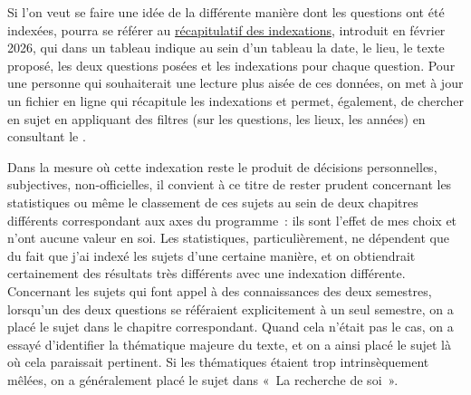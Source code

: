 Si l'on veut se faire une idée de la différente manière dont les questions ont été indexées, pourra se référer au \hyperlink{synthesesujets}{récapitulatif des indexations}, introduit en février 2026, qui dans un tableau indique au sein d'un tableau la date, le lieu, le texte proposé, les deux questions posées et les indexations pour chaque question. Pour une personne qui souhaiterait une lecture plus aisée de ces données, on met à jour un fichier en ligne qui récapitule les indexations et permet, également, de chercher en sujet en appliquant des filtres (sur les questions, les lieux, les années) en consultant le \sujetscsv{}.

Dans la mesure où cette indexation reste le produit de décisions personnelles, subjectives, non-officielles, il convient à ce titre de rester prudent concernant les statistiques ou même le classement de ces sujets au sein de deux chapitres différents correspondant aux axes du programme~: ils sont l'effet de mes choix et n'ont aucune valeur en soi. Les statistiques, particulièrement, ne dépendent que du fait que j'ai indexé les sujets d'une certaine manière, et on obtiendrait certainement des résultats très différents avec une indexation différente. Concernant les sujets qui font appel à des connaissances des deux semestres, lorsqu'un des deux questions se référaient explicitement à un seul semestre, on a placé le sujet dans le chapitre correspondant. Quand cela n'était pas le cas, on a essayé d'identifier la thématique majeure du texte, et on a ainsi placé le sujet là où cela paraissait pertinent. Si les thématiques étaient trop intrinsèquement mêlées, on a généralement placé le sujet dans «~La recherche de soi~»{}. 

